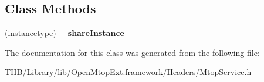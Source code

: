 \subsection*{Class Methods}
\begin{DoxyCompactItemize}
\item 
\mbox{\label{interface_mtop_service_af2afc8041cb02a3b4f6450d530cf66b9}} 
(instancetype) + {\bfseries share\+Instance}
\end{DoxyCompactItemize}


The documentation for this class was generated from the following file\+:\begin{DoxyCompactItemize}
\item 
T\+H\+B/\+Library/lib/\+Open\+Mtop\+Ext.\+framework/\+Headers/Mtop\+Service.\+h\end{DoxyCompactItemize}
